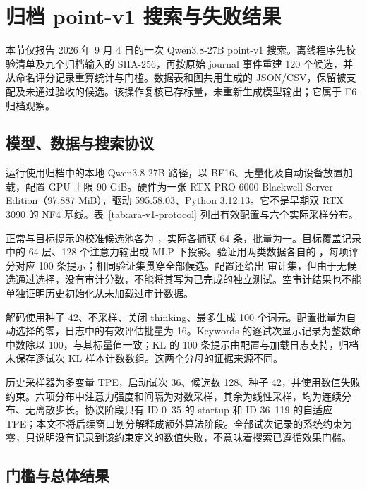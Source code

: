 \section{归档 point-v1 搜索与失败结果}
\label{sec:ara-v1-results}

本节仅报告 2026 年 9 月 4 日的一次 Qwen3.8-27B point-v1 搜索\cite{ara2026archive}。离线程序先校验清单及九个归档输入的 SHA-256，再按原始 journal 事件重建 120 个候选，并从命名评分记录重算统计与门槛。数据表和图共用生成的 JSON/CSV，保留被支配及未通过验收的候选。该操作复核已存标量，未重新生成模型输出；它属于 E6 归档观察。

\subsection{模型、数据与搜索协议}

运行使用归档中的本地 Qwen3.8-27B 路径，以 BF16、无量化及自动设备放置加载，配置 GPU 上限 90 GiB。硬件为一张 RTX PRO 6000 Blackwell Server Edition（97,887 MiB），驱动 595.58.03、Python 3.12.13。它不是早期双 RTX 3090 的 NF4 基线。表~\ref{tab:ara-v1-protocol} 列出有效配置与六个实际采样分布。



正常与目标提示的校准候选池各为 ，实际各捕获 64 条，批量为一。目标覆盖记录中的 64 层、128 个注意力输出或 MLP 下投影。验证用两类数据各自的 ，每项评分对应 100 条提示；相同验证集贯穿全部候选。配置还给出  审计集，但由于无候选通过选择，没有审计分数，不能将其写为已完成的独立测试。空审计结果也不能单独证明历史初始化从未加载过审计数据。

解码使用种子 42、不采样、关闭 thinking、最多生成 100 个词元。配置批量为自动选择的零，日志中的有效评估批量为 16。Keywords 的逐试次显示记录为整数命中数除以 100，与其标量值一致；KL 的 100 条提示由配置与加载日志支持，归档未保存逐试次 KL 样本计数数组。这两个分母的证据来源不同。

历史采样器为多变量 TPE，启动试次 36、候选数 128、种子 42，并使用数值失败约束。六项分布中注意力强度和间隔为对数采样，其余为线性采样，均为连续分布、无离散步长。协议阶段只有 ID 0--35 的 startup 和 ID 36--119 的自适应 TPE；本文不将后续窗口划分解释成额外算法阶段。全部试次记录的系统约束为零，只说明没有记录到该约束定义的数值失败，不意味着搜索已遵循效果门槛。

\subsection{门槛与总体结果}

